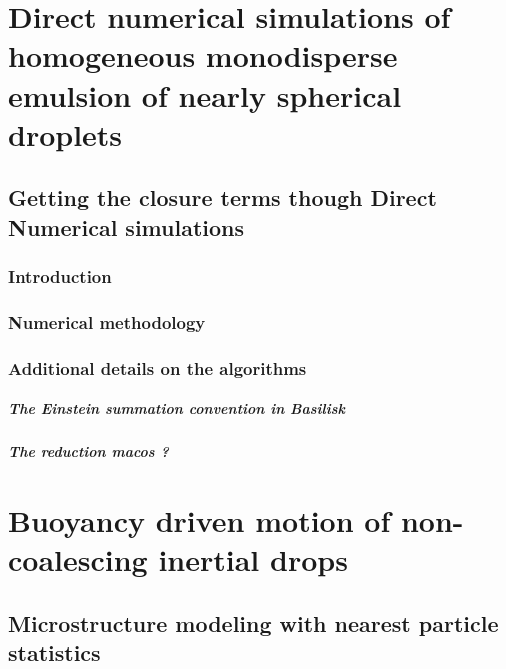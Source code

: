 \documentclass[12pt,a4paper,openany]{My_book}
\begin{document}
\part{Direct numerical simulations of homogeneous monodisperse emulsion of nearly spherical droplets}

\chapter{Getting the closure terms though Direct Numerical simulations}
\label{chap:DNS}
\localtableofcontents

\section{Introduction}

% 

% 
% 


\section{Numerical methodology}
\label{sec:methodo}






\section{Additional details on the algorithms}

\subsubsection{The Einstein summation convention in Basilisk}
\subsubsection{The reduction macos ? }

\part{Buoyancy driven motion of non-coalescing inertial drops}

\chapter{Microstructure modeling with nearest particle statistics}
\localtableofcontents
\end{document}
